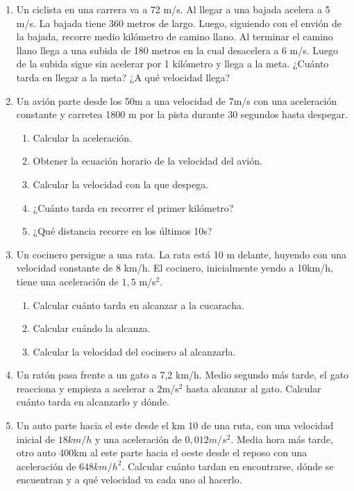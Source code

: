 \begin{enumerate}
\item Un ciclista en una carrera va a 72 m/s. Al llegar a una bajada acelera a 5 m/s. La bajada tiene 360 metros de largo. Luego, siguiendo con el envión de la bajada, recorre medio kilómetro de camino llano. Al terminar el camino llano llega a una subida de 180 metros en la cual desacelera a 6 m/s. Luego de la subida sigue sin acelerar por 1 kilómetro y llega a la meta. ¿Cuánto tarda en llegar a la meta? ¿A qué velocidad llega?

\item Un avión parte desde los 50m a una velocidad de 7m/s con una aceleración constante y carretea 1800 m por la pista durante 30 segundos hasta despegar.

\begin{enumerate}
\item Calcular la aceleración. %
\item Obtener la ecuación horario de la velocidad del avión.
\item Calcular la velocidad con la que despega. %
\item ¿Cuánto tarda en recorrer el primer kilómetro? %
\item ¿Qué distancia recorre en los últimos 10s?
\end{enumerate}

\item Un cocinero persigue a una rata. La rata está 10 m delante, huyendo con una velocidad constante de 8 km/h. El cocinero, inicialmente yendo a 10km/h, tiene una aceleración de $1,5$ m/s$^2$.
\begin{enumerate}
    \item Calcular cuánto tarda en alcanzar a la cucaracha.
    \item Calcular cuándo la alcanza.
    \item Calcular la velocidad del cocinero al alcanzarla.
\end{enumerate}

\item Un ratón pasa frente a un gato a 7,2 km/h. Medio segundo más tarde, el gato reacciona y empieza a acelerar a 2m/s$^2$ hasta alcanzar al gato. Calcular cuánto tarda en alcanzarlo y dónde.


\item Un auto parte hacia el este desde el km 10 de una ruta, con una velocidad inicial de $18 km/h$ y una aceleración de $0,012 m/s^2$. Media hora más tarde, otro auto 400km al este parte hacia el oeste desde el reposo con una aceleración de $648 km/h^2$. Calcular cuánto tardan en encontrarse, dónde se encuentran y a qué velocidad va cada uno al hacerlo.
\end{enumerate}



